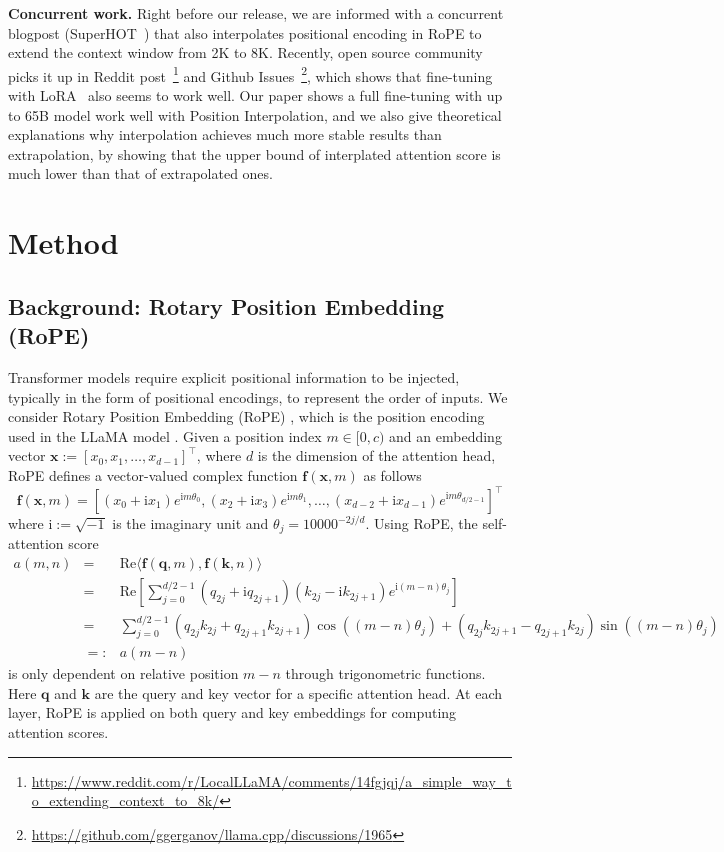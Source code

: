 \documentclass{article} %
\theoremstyle{definition}
\begin{document}
\textbf{Concurrent work.} Right before our release, we are informed with a concurrent blogpost (SuperHOT~\cite{superhot}) that also interpolates positional encoding in RoPE to extend the context window from 2K to 8K. Recently, open source community picks it up in Reddit post~\footnote{\url{https://www.reddit.com/r/LocalLLaMA/comments/14fgjqj/a_simple_way_to_extending_context_to_8k/}} and Github Issues~\footnote{\url{https://github.com/ggerganov/llama.cpp/discussions/1965}}, which shows that fine-tuning with LoRA~\citep{hu2021lora} also seems to work well. Our paper shows a full fine-tuning with up to 65B model work well with Position Interpolation, and we also give theoretical explanations why interpolation achieves much more stable results than extrapolation, by showing that the upper bound of interplated attention score is much lower than that of extrapolated ones.  

\section{Method}

\def\vf{\mathbf{f}}
\def\vx{\mathbf{x}}
\def\vk{\mathbf{k}}
\def\vq{\mathbf{q}}
\def\vu{\mathbf{u}}
\def\di{\mathrm{i}}

\subsection{Background: Rotary Position Embedding (RoPE)} 
Transformer models require explicit positional information to be injected, typically in the form of positional encodings, to represent the order of inputs. We consider Rotary Position Embedding (RoPE) \citep{su2021roformer}, which is the position encoding used in the LLaMA model \citep{touvron2023llama}. Given a position index $m \in [0, c)$ and an embedding vector $\vx := [x_0, x_1, \ldots, x_{d-1}]^\top$, where $d$ is the dimension of the attention head, RoPE defines a vector-valued complex function $\vf(\vx, m)$ as follows
\begin{equation}
    \vf(\vx,m) = [(x_0 + \di x_1) e^{\di m \theta_0}, (x_2 + \di x_3) e^{\di m \theta_1}, \ldots, (x_{d-2} + \di x_{d-1})e^{\di m \theta_{d/2-1}}]^\top
\end{equation}
where $\di := \sqrt{-1}$ is the imaginary unit and $\theta_j = 10000^{-2j/d}$. Using RoPE, the self-attention score 
\begin{eqnarray}
a(m,n) &=& \mathrm{Re}\langle\vf(\vq, m), \vf(\vk, n)\rangle \nonumber \\
&=& \mathrm{Re}\left[\sum_{j=0}^{d/2-1} (q_{2j} +\di q_{2j+1})(k_{2j} - \di k_{2j+1}) e^{\di (m-n)\theta_j}\right] \nonumber \\
&=& \sum_{j=0}^{d/2-1} (q_{2j} k_{2j} + q_{2j+1}k_{2j+1})\cos((m-n)\theta_j) + (q_{2j} k_{2j+1} - q_{2j+1}k_{2j})\sin((m-n)\theta_j) \nonumber \\
&=:& a(m-n) \label{eq:attn-score}
\end{eqnarray}
is only dependent on relative position $m-n$ through trigonometric functions. Here $\vq$ and $\vk$ are the query and key vector for a specific attention head. At each layer, RoPE is applied on both query and key embeddings for computing attention scores. 
\end{document}
